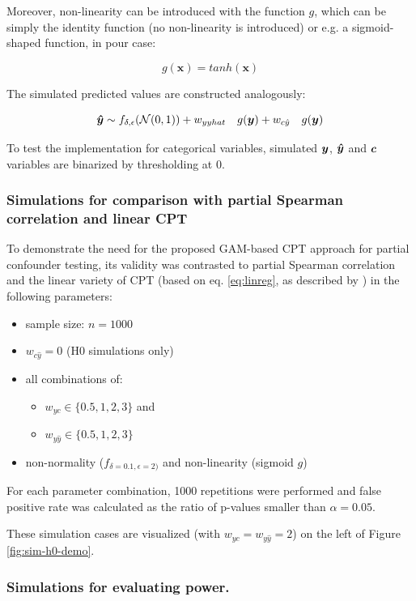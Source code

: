 \documentclass{article}
\begin{document}
Moreover, non-linearity can be introduced with the function $g$, which can be simply the identity function (no non-linearity is introduced) or e.g. a sigmoid-shaped function, in pour case:

$$ g(\boldsymbol{x}) = tanh(\boldsymbol{x}) $$


The simulated predicted values are constructed analogously:

$$ \boldsymbol{\hat{y}} \sim f_{\delta, \epsilon}(\mathcal{N}(0, 1)) + w_{yyhat} \quad g(\boldsymbol{y})  + w_{c\hat{y}} \quad g(\boldsymbol{y})$$

To test the implementation for categorical variables, simulated $\boldsymbol{y}$, $\boldsymbol{\hat{y}}$ and $\boldsymbol{c}$ variables are binarized by thresholding at 0.

\subsubsection*{Simulations for comparison with partial Spearman correlation and linear CPT}

To demonstrate the need for the proposed GAM-based CPT approach for partial confounder testing, its validity was contrasted to partial Spearman correlation and the linear variety of CPT (based on eq. \ref{eq:linreg}, as described by \citep{berrett2020conditional}) in the following parameters:
\begin{itemize}
    \item sample size: $n = 1000$
    \item $w_{c\hat{y}} = 0$ (H0 simulations only)
    \item all combinations of:
    \begin{itemize}
        \item $w_{yc} \in \{0.5, 1, 2, 3\}$ and
        \item $w_{y\hat{y}} \in \{0.5, 1, 2, 3\}$
    \end{itemize}
    \item non-normality ($f_{\delta = 0.1, \epsilon = 2)}$ and non-linearity (sigmoid $g$)
\end{itemize}

For each parameter combination, 1000 repetitions were performed and false positive rate was calculated as the ratio of p-values smaller than $\alpha = 0.05$.

These simulation cases are visualized (with $w_{yc} = w_{y\hat{y}} = 2$) on the left of Figure \ref{fig:sim-h0-demo}.

\subsubsection*{Simulations for evaluating power.}
\end{document}

